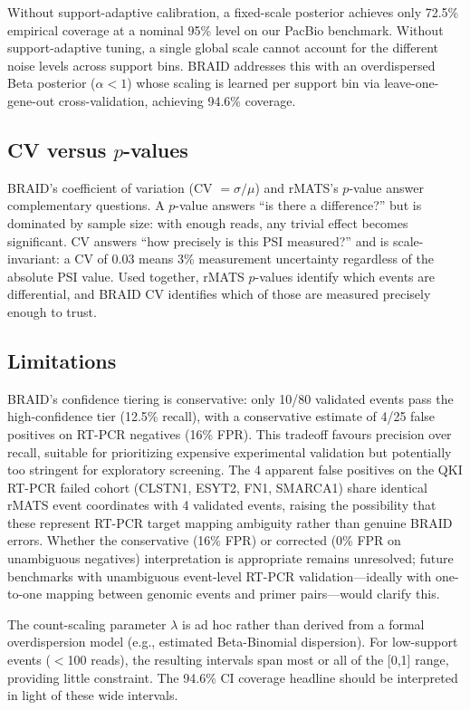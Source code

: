 \documentclass[10pt]{article}
\begin{document}
Without support-adaptive calibration, a fixed-scale posterior achieves only 72.5\% empirical coverage at a nominal 95\% level on our PacBio benchmark.
Without support-adaptive tuning, a single global scale cannot account for the different noise levels across support bins\citep{robinson2010}.
BRAID addresses this with an overdispersed Beta posterior ($\alpha < 1$) whose scaling is learned per support bin via leave-one-gene-out cross-validation, achieving 94.6\% coverage.

\subsection*{CV versus $p$-values}

BRAID's coefficient of variation (CV $= \sigma / \mu$) and rMATS's $p$-value answer complementary questions.
A $p$-value answers ``is there a difference?'' but is dominated by sample size: with enough reads, any trivial effect becomes significant.
CV answers ``how precisely is this PSI measured?'' and is scale-invariant: a CV of 0.03 means 3\% measurement uncertainty regardless of the absolute PSI value.
Used together, rMATS $p$-values identify which events are differential, and BRAID CV identifies which of those are measured precisely enough to trust.

\subsection*{Limitations}

BRAID's confidence tiering is conservative: only 10/80 validated events pass the high-confidence tier (12.5\% recall), with a conservative estimate of 4/25 false positives on RT-PCR negatives (16\% FPR).
This tradeoff favours precision over recall, suitable for prioritizing expensive experimental validation but potentially too stringent for exploratory screening.
The 4 apparent false positives on the QKI RT-PCR failed cohort (CLSTN1, ESYT2, FN1, SMARCA1) share identical rMATS event coordinates with 4 validated events, raising the possibility that these represent RT-PCR target mapping ambiguity rather than genuine BRAID errors.
Whether the conservative (16\% FPR) or corrected (0\% FPR on unambiguous negatives) interpretation is appropriate remains unresolved; future benchmarks with unambiguous event-level RT-PCR validation---ideally with one-to-one mapping between genomic events and primer pairs---would clarify this.

The count-scaling parameter $\lambda$ is ad hoc rather than derived from a formal overdispersion model (e.g., estimated Beta-Binomial dispersion).
For low-support events ($<$100 reads), the resulting intervals span most or all of the [0,1] range, providing little constraint.
The 94.6\% CI coverage headline should be interpreted in light of these wide intervals.
\end{document}
